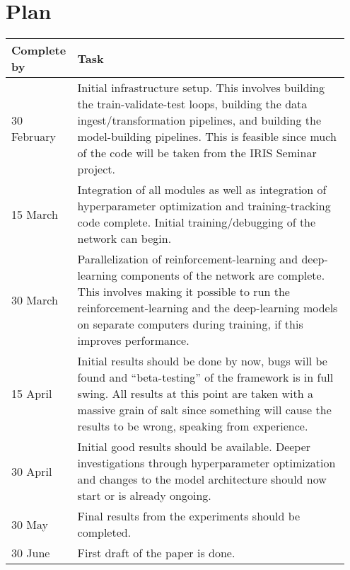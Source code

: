 \chapter{Plan}


\begin{table}[ht]
	\centering
	\begin{tabular}{@{}p{0.15\linewidth}p{0.8\linewidth}@{}}
		\toprule
		Complete by & Task                                                                                                                                                                                                                   \\ \midrule
		30 February & Initial infrastructure setup. This involves building the train-validate-test loops, building the data ingest/transformation pipelines, and building the model-building pipelines. This is feasible since much of the code will be taken from the IRIS Seminar project. \\
		15 March    & Integration of all modules as well as integration of hyperparameter optimization and training-tracking code complete. Initial training/debugging of the network can begin.                                                        \\
		30 March    & Parallelization of reinforcement-learning and deep-learning components of the network are complete. This involves making it possible to run the reinforcement-learning and the deep-learning models on separate computers during training, if this improves performance. \\
		15 April    & Initial results should be done by now, bugs will be found and ``beta-testing'' of the framework is in full swing. All results at this point are taken with a massive grain of salt since something will cause the results to be wrong, speaking from experience. \\
		30 April    & Initial good results should be available. Deeper investigations through hyperparameter optimization and changes to the model architecture should now start or is already ongoing.                                                         \\
		30 May      & Final results from the experiments should be completed.                                                                                                                                                                 \\
		30 June     & First draft of the paper is done.                                                                                                                                                                                      \\

\end{tabular}
\end{table}
